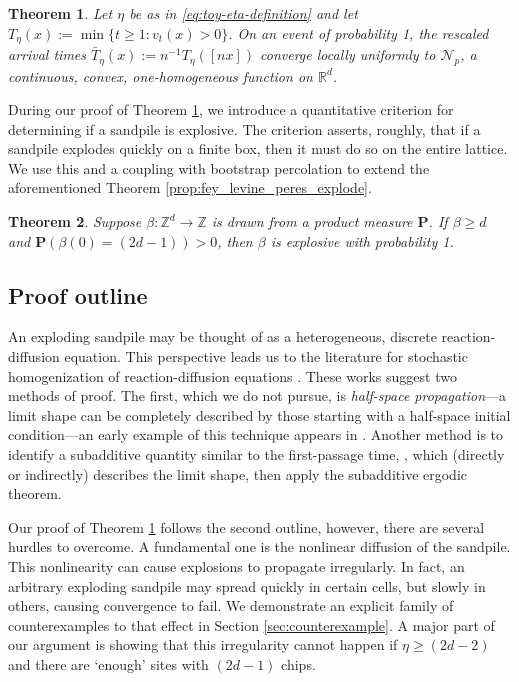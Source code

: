 \documentclass[aap]{imsart}
\newcommand{\R}{\mathbb{R}}
\newcommand{\Z}{\mathbb{Z}}
\newtheorem{theorem}{Theorem}[section]
\begin{document}
\begin{theorem} \label{theorem:convergence_of_time_constant}
		Let $\eta$ be as in \eqref{eq:toy-eta-definition} and let $T_{\eta}(x) := \min\{t \geq 1 : v_t(x) > 0 \}$. On an event of probability 1, the rescaled arrival times $\bar{T}_{\eta}(x) := n^{-1} T_{\eta}([ n x])$
	converge locally uniformly to $\mathcal{N}_{p}$, a continuous, convex, one-homogeneous function on $\R^d$. 
\end{theorem}
During our proof of Theorem \ref{theorem:convergence_of_time_constant}, we introduce a quantitative criterion for determining if a sandpile is explosive. The criterion asserts, roughly, that if a sandpile explodes quickly on a finite box, then it must do so on the entire lattice. 
We use this and a coupling with bootstrap percolation to extend the aforementioned Theorem \ref{prop:fey_levine_peres_explode}. 
\begin{theorem} \label{theorem:explosive}
	Suppose $\beta:\Z^d \to \Z$ is drawn from a product measure $\mathbf{P}$.  If $\beta \geq d$ and $\mathbf{P}(\beta(0) = (2 d - 1)) > 0$,
	then $\beta$ is explosive with probability 1.
\end{theorem}



\subsection{Proof outline}
An exploding sandpile may be thought of as a heterogeneous, discrete reaction-diffusion equation. This perspective leads us to the literature for stochastic homogenization of reaction-diffusion equations \cite{zhang2020long, feldman2019mean, lin2019stochastic, armstrong2018stochastic, caffarelli2014counter, gravner2006random, ishii1999threshold, barles1998new, gravner1996first,gravner1993threshold, willson1978convergence}. These works suggest two methods of proof. The first, which we do not pursue, is {\it half-space propagation}---a limit shape can be completely described by those starting with a half-space initial condition---an early example of this technique appears in \cite{willson1978convergence}. 
Another method is to identify a subadditive quantity similar to the first-passage time, \cite{cox1981some}, which (directly or indirectly) describes the limit shape, then apply the subadditive ergodic theorem.


Our proof of Theorem \ref{theorem:convergence_of_time_constant} follows the second outline,
however, there are several hurdles to overcome. A fundamental one is the nonlinear diffusion of the sandpile. This nonlinearity can cause explosions to propagate irregularly. In fact, an arbitrary exploding sandpile may spread quickly in certain cells, but slowly in others, causing convergence to fail. We demonstrate an explicit family of counterexamples to that effect in Section \ref{sec:counterexample}. A major part of our argument is showing that this irregularity cannot happen if $\eta \geq (2 d - 2)$ and there are `enough' sites with $(2d - 1)$ chips. 
\end{document}
